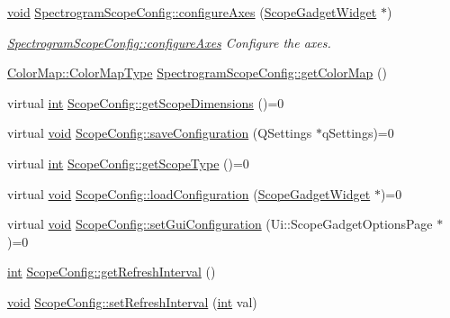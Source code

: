 \begin{DoxyCompactItemize}
\hyperlink{group___u_a_v_objects_plugin_ga444cf2ff3f0ecbe028adce838d373f5c}{void} \hyperlink{group___scope_plugin_ga607c43753c7a8540b7953d4945f2f6b5}{Spectrogram\-Scope\-Config\-::configure\-Axes} (\hyperlink{class_scope_gadget_widget}{Scope\-Gadget\-Widget} $\ast$)
\begin{DoxyCompactList}\small\item\em \hyperlink{group___scope_plugin_ga607c43753c7a8540b7953d4945f2f6b5}{Spectrogram\-Scope\-Config\-::configure\-Axes} Configure the axes. \end{DoxyCompactList}\item 
\hyperlink{group___scope_plugin_ga7f4f087196557757ec8061242e795031}{Color\-Map\-::\-Color\-Map\-Type} \hyperlink{group___scope_plugin_ga429eb179a2c1b1f46a1d45a699e983f2}{Spectrogram\-Scope\-Config\-::get\-Color\-Map} ()
\item 
virtual \hyperlink{ioapi_8h_a787fa3cf048117ba7123753c1e74fcd6}{int} \hyperlink{group___scope_plugin_ga4eaff3a14398928e3ffba453ea199699}{Scope\-Config\-::get\-Scope\-Dimensions} ()=0
\item 
virtual \hyperlink{group___u_a_v_objects_plugin_ga444cf2ff3f0ecbe028adce838d373f5c}{void} \hyperlink{group___scope_plugin_gac41e7079a53acbf5fc4c32b59c120da2}{Scope\-Config\-::save\-Configuration} (Q\-Settings $\ast$q\-Settings)=0
\item 
virtual \hyperlink{ioapi_8h_a787fa3cf048117ba7123753c1e74fcd6}{int} \hyperlink{group___scope_plugin_gafdf4c997ec7b0c40644711b3578db610}{Scope\-Config\-::get\-Scope\-Type} ()=0
\item 
virtual \hyperlink{group___u_a_v_objects_plugin_ga444cf2ff3f0ecbe028adce838d373f5c}{void} \hyperlink{group___scope_plugin_gaea33bfb89c03afcf1f81969983ed926c}{Scope\-Config\-::load\-Configuration} (\hyperlink{class_scope_gadget_widget}{Scope\-Gadget\-Widget} $\ast$)=0
\item 
virtual \hyperlink{group___u_a_v_objects_plugin_ga444cf2ff3f0ecbe028adce838d373f5c}{void} \hyperlink{group___scope_plugin_ga322c46b28e707e71d7076f0e51cdc0b4}{Scope\-Config\-::set\-Gui\-Configuration} (Ui\-::\-Scope\-Gadget\-Options\-Page $\ast$)=0
\item 
\hyperlink{ioapi_8h_a787fa3cf048117ba7123753c1e74fcd6}{int} \hyperlink{group___scope_plugin_ga6886a1b5239454cd6525352914381382}{Scope\-Config\-::get\-Refresh\-Interval} ()
\item 
\hyperlink{group___u_a_v_objects_plugin_ga444cf2ff3f0ecbe028adce838d373f5c}{void} \hyperlink{group___scope_plugin_ga9d0e03a1430ff0f766ff51a3daafb2ee}{Scope\-Config\-::set\-Refresh\-Interval} (\hyperlink{ioapi_8h_a787fa3cf048117ba7123753c1e74fcd6}{int} val)

\end{DoxyCompactItemize}
